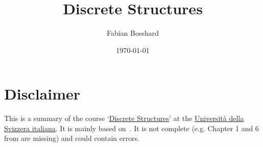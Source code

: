 
 




\title{Discrete Structures}
\author{Fabian Bosshard}
\date{\today}






\maketitle


\thispagestyle{empty}
\tableofcontents

{}    
\setcounter{page}{2}      %
\makeatletter
\renewcommand*{\thepage}{\number\numexpr\value{page}-1\relax}
\makeatother              %
\section*{Disclaimer}
This is a summary of the course `\href{https://search.usi.ch/courses/35270737/discrete-structures}{Discrete Structures}' at the \href{https://www.usi.ch/it}{Università della Svizzera italiana}.
It is mainly based on~\cite{boschini2022}.
It is not complete (e.g. Chapter 1 and 6 from \cite{boschini2022} are missing) and could contain errors.

